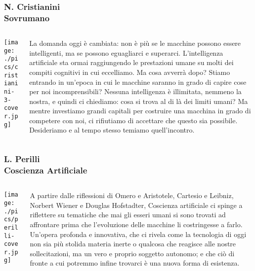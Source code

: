 \documentclass[aspectratio=169]{beamer}
\begin{document}
%
%
\begin{frame}
\frametitle{\small N. Cristianini   \\ \normalsize \textbf{Sovrumano}}
\begin{columns}[c]
\begin{column}{0.35\textwidth}
    \centering
    \texttt{[image: ./pics/cristianini-3-cover.jpg]}
\end{column}
\begin{column}{0.6\textwidth}
    {\small
La domanda oggi è cambiata: non è più se le macchine possono essere intelligenti, ma se possono eguagliarci e superarci. L'intelligenza artificiale sta ormai raggiungendo le prestazioni umane  su molti dei compiti cognitivi in cui eccelliamo. Ma cosa avverrà dopo? Stiamo entrando in un'epoca in cui le macchine saranno in grado di capire cose per noi incomprensibili? Nessuna intelligenza è illimitata, nemmeno la nostra, e quindi ci chiediamo: cosa si trova al di là dei limiti umani? Ma mentre investiamo grandi capitali per costruire una macchina in grado di competere con noi, ci rifiutiamo di accettare che questo sia possibile. Desideriamo e al tempo stesso temiamo quell'incontro. 
}
\end{column}
\end{columns}
\end{frame}
%
%
\begin{frame}
\frametitle{\small L. Perilli  \\ \normalsize \textbf{Coscienza Artificiale}}
\begin{columns}[c]
\begin{column}{0.35\textwidth}
    \centering
    \texttt{[image: ./pics/perilli-cover.jpg]}
\end{column}
\begin{column}{0.6\textwidth}
    {\small
A partire dalle riflessioni di Omero e Aristotele, Cartesio e Leibniz, Norbert Wiener e Douglas Hofstadter, Coscienza artificiale ci spinge a riflettere su tematiche che mai gli esseri umani si sono trovati ad affrontare prima che l'evoluzione delle macchine li costringesse a farlo. Un'opera profonda e innovativa, che ci rivela come la tecnologia di oggi non sia più stolida materia inerte o qualcosa che reagisce alle nostre sollecitazioni, ma un vero e proprio soggetto autonomo; e che ciò di fronte a cui potremmo infine trovarci è una nuova forma di esistenza.
}
\end{column}
\end{columns}
\end{frame}
\end{document}
